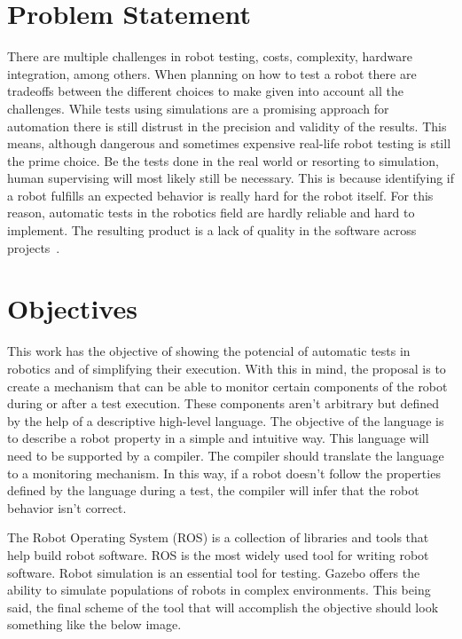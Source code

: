 \section{Problem Statement}
\label{sec:problem}

There are multiple challenges in robot testing, costs, 
complexity, hardware integration, among others.
When planning on how to test a robot there are tradeoffs between the 
different choices to make given into account all the challenges.
While tests using simulations are a promising approach for automation 
there is still distrust in the precision and validity of the results.
This means, although dangerous and sometimes expensive real-life 
robot testing is still the prime choice.
Be the tests done in the real world or resorting to simulation, 
human supervising will most likely still be necessary.
This is because identifying if a robot fulfills an expected 
behavior is really hard for the robot itself.
For this reason, automatic tests in the robotics field are 
hardly reliable and hard to implement.
The resulting product is a lack of quality in the software 
across projects~\cite{TestRob}.

\section{Objectives}
\label{sec:objectives}

This work has the objective of showing the potencial of automatic 
tests in robotics and of simplifying their execution.
With this in mind, the proposal is to create a mechanism that can be able 
to monitor certain components of the robot during or after a test execution.
These components aren't arbitrary but defined by the help of a descriptive high-level language.
The objective of the language is to describe a robot property in a simple and intuitive way.
This language will need to be supported by a compiler. 
The compiler should translate the language to a monitoring mechanism.
In this way, if a robot doesn't follow the properties defined by the language 
during a test, the compiler will infer that the robot behavior isn't correct.

\par

The Robot Operating System (ROS) is a collection of libraries and tools that help 
build robot software. ROS is the most widely used tool for writing robot software.
Robot simulation is an essential tool for testing. Gazebo offers the ability 
to simulate populations of robots in complex environments.
This being said, the final scheme of the tool that will accomplish the objective 
should look something like the below image.


